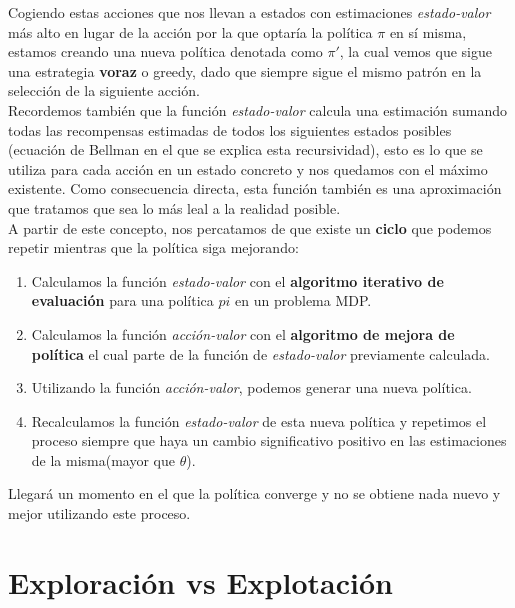 \documentclass[11pt,fleqn]{book} %
\begin{document}
Cogiendo estas acciones que nos llevan a estados con estimaciones \textit{estado-valor} más alto en lugar de la acción por la que optaría la política $\pi$ en sí misma, estamos creando una nueva política denotada como $\pi'$, la cual vemos que sigue una estrategia \textbf{voraz} o greedy, dado que siempre sigue el mismo patrón en la selección de la siguiente acción. \\

Recordemos también que la función \textit{estado-valor} calcula una estimación sumando todas las recompensas estimadas de todos los siguientes estados posibles (ecuación de Bellman en el que se explica esta recursividad), esto es lo que se utiliza para cada acción en un estado concreto y nos quedamos con el máximo existente. Como consecuencia directa, esta función también es una aproximación que tratamos que sea lo más leal a la realidad posible. \\

A partir de este concepto, nos percatamos de que existe un \textbf{ciclo} que podemos repetir mientras que la política siga mejorando: \\

\begin{enumerate}
	\item Calculamos la función \textit{estado-valor} con el \textbf{algoritmo iterativo de evaluación} para una política $pi$ en un problema MDP. \\
	
	\item Calculamos la función \textit{acción-valor} con el \textbf{algoritmo de mejora de política} el cual parte de la función de \textit{estado-valor} previamente calculada. \\
	
	\item Utilizando la función \textit{acción-valor}, podemos generar una nueva política. \\
	
	\item Recalculamos la función \textit{estado-valor} de esta nueva política y repetimos el proceso siempre que haya un cambio significativo positivo en las estimaciones de la misma(mayor que $\theta$). \\	
\end{enumerate}

Llegará un momento en el que la política converge y no se obtiene nada nuevo y mejor utilizando este proceso.

\section{Exploración vs Explotación}\label{sec:probabilidades}
\end{document}
